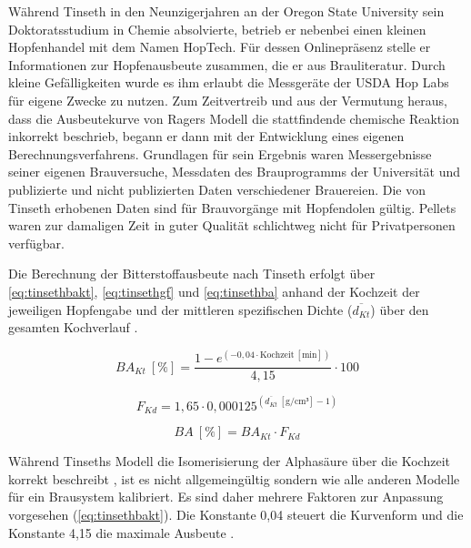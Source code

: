 \documentclass[a4paper,parskip=half]{scrartcl}
\newcommand{\BA}{\mathit{BA}}
\newcommand{\BAKt}{{\mathit{BA}}_{\mathit{Kt}}}
\newcommand{\umin}{\:[\textrm{min}]}
\newcommand{\uden}{\:[\text{g/cm³}]}
\newcommand{\uper}{\:[\text{\%}]}
\newcommand{\FKd}{F_{\mathit{Kd}}}
\newcommand{\dKt}{\overline{d_{\mathit{Kt}}}}
\begin{document}
Während Tinseth in den Neunzigerjahren an
der Oregon State University sein Doktoratsstudium in Chemie absolvierte,
betrieb er nebenbei einen kleinen Hopfenhandel mit dem Namen HopTech.
Für dessen
Onlinepräsenz stelle er Informationen zur Hopfenausbeute zusammen,
die er aus Brauliteratur.
Durch kleine Gefälligkeiten wurde es ihm erlaubt die Messgeräte
der USDA Hop Labs für eigene Zwecke zu nutzen. Zum Zeitvertreib
und aus der Vermutung heraus, dass die Ausbeutekurve von Ragers
Modell die stattfindende
chemische Reaktion inkorrekt beschrieb, begann er dann mit
der Entwicklung eines eigenen Berechnungsverfahrens.
Grundlagen für sein Ergebnis waren Messergebnisse
seiner eigenen Brauversuche, Messdaten des Brauprogramms der
Universität und publizierte und nicht publizierten Daten verschiedener
Brauereien. Die von Tinseth erhobenen Daten sind für
Brauvorgänge mit Hopfendolen gültig. Pellets waren zur
damaligen Zeit in guter Qualität schlichtweg nicht für Privatpersonen
verfügbar. \parencites[0:55:45-1:08:00]{Beechum2017a}[2:10-6:30]{Smith2011}

Die Berechnung der Bitterstoffausbeute nach Tinseth erfolgt über
\autoref{eq:tinsethbakt}, \autoref{eq:tinsethgf} und \autoref{eq:tinsethba}
anhand der Kochzeit der jeweiligen Hopfengabe und der mittleren
spezifischen Dichte ($\dKt$) über den gesamten Kochverlauf \parencite{Tinseth1997}.

\begin{equation}
\BAKt \uper = \frac{1 - e^{\left(-0,04 \cdot \text{Kochzeit} \umin \right)}}{4,15} \cdot 100
\label{eq:tinsethbakt}
\end{equation}

\begin{equation}
\FKd = 1,65 \cdot 0,000125^{\left(\overline{d_{\mathit{Kt}}} \uden - 1 \right)}
\label{eq:tinsethgf}
\end{equation}

\begin{equation}
\BA \uper = \BAKt \cdot \FKd
\label{eq:tinsethba}
\end{equation}



Während Tinseths Modell die Isomerisierung der Alphasäure über
die Kochzeit korrekt beschreibt \parencite[43]{Malowicki2005}, ist es
nicht allgemeingültig sondern wie alle anderen Modelle für ein
Brausystem kalibriert. Es sind daher mehrere Faktoren zur Anpassung
vorgesehen (\autoref{eq:tinsethbakt}). Die Konstante 0,04 steuert die
Kurvenform und die Konstante 4,15  die maximale Ausbeute
\parencite{Tinseth1997}.
\end{document}
